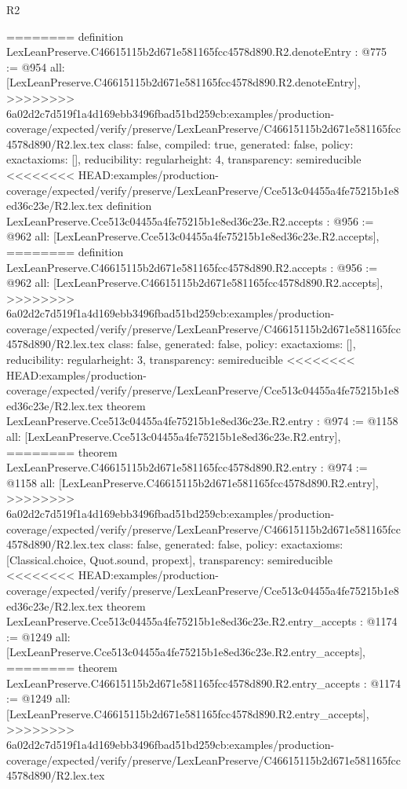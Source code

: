\begin{lexlean}{R2}
\begin{coremodule}
{{{{{{{{{{{{{{{{{{========
definition LexLeanPreserve.C46615115b2d671e581165fcc4578d890.R2.denoteEntry : @775 := @954 {
  all: [LexLeanPreserve.C46615115b2d671e581165fcc4578d890.R2.denoteEntry],
>>>>>>>> 6a02d2c7d519f1a4d169ebb3496fbad51bd259cb:examples/production-coverage/expected/verify/preserve/LexLeanPreserve/C46615115b2d671e581165fcc4578d890/R2.lex.tex
  class: false,
  compiled: true,
  generated: false,
  policy: exact{axioms: []},
  reducibility: regular{height: 4},
  transparency: semireducible
}
<<<<<<<< HEAD:examples/production-coverage/expected/verify/preserve/LexLeanPreserve/Cce513c04455a4fe75215b1e8ed36c23e/R2.lex.tex
definition LexLeanPreserve.Cce513c04455a4fe75215b1e8ed36c23e.R2.accepts : @956 := @962 {
  all: [LexLeanPreserve.Cce513c04455a4fe75215b1e8ed36c23e.R2.accepts],
========
definition LexLeanPreserve.C46615115b2d671e581165fcc4578d890.R2.accepts : @956 := @962 {
  all: [LexLeanPreserve.C46615115b2d671e581165fcc4578d890.R2.accepts],
>>>>>>>> 6a02d2c7d519f1a4d169ebb3496fbad51bd259cb:examples/production-coverage/expected/verify/preserve/LexLeanPreserve/C46615115b2d671e581165fcc4578d890/R2.lex.tex
  class: false,
  generated: false,
  policy: exact{axioms: []},
  reducibility: regular{height: 3},
  transparency: semireducible
}
<<<<<<<< HEAD:examples/production-coverage/expected/verify/preserve/LexLeanPreserve/Cce513c04455a4fe75215b1e8ed36c23e/R2.lex.tex
theorem LexLeanPreserve.Cce513c04455a4fe75215b1e8ed36c23e.R2.entry : @974 := @1158 {
  all: [LexLeanPreserve.Cce513c04455a4fe75215b1e8ed36c23e.R2.entry],
========
theorem LexLeanPreserve.C46615115b2d671e581165fcc4578d890.R2.entry : @974 := @1158 {
  all: [LexLeanPreserve.C46615115b2d671e581165fcc4578d890.R2.entry],
>>>>>>>> 6a02d2c7d519f1a4d169ebb3496fbad51bd259cb:examples/production-coverage/expected/verify/preserve/LexLeanPreserve/C46615115b2d671e581165fcc4578d890/R2.lex.tex
  class: false,
  generated: false,
  policy: exact{axioms: [Classical.choice, Quot.sound, propext]},
  transparency: semireducible
}
<<<<<<<< HEAD:examples/production-coverage/expected/verify/preserve/LexLeanPreserve/Cce513c04455a4fe75215b1e8ed36c23e/R2.lex.tex
theorem LexLeanPreserve.Cce513c04455a4fe75215b1e8ed36c23e.R2.entry_accepts : @1174 := @1249 {
  all: [LexLeanPreserve.Cce513c04455a4fe75215b1e8ed36c23e.R2.entry_accepts],
========
theorem LexLeanPreserve.C46615115b2d671e581165fcc4578d890.R2.entry_accepts : @1174 := @1249 {
  all: [LexLeanPreserve.C46615115b2d671e581165fcc4578d890.R2.entry_accepts],
>>>>>>>> 6a02d2c7d519f1a4d169ebb3496fbad51bd259cb:examples/production-coverage/expected/verify/preserve/LexLeanPreserve/C46615115b2d671e581165fcc4578d890/R2.lex.tex
}}}}}}}}}}}}}}}}}}}}}}
\end{coremodule}
\end{lexlean}
